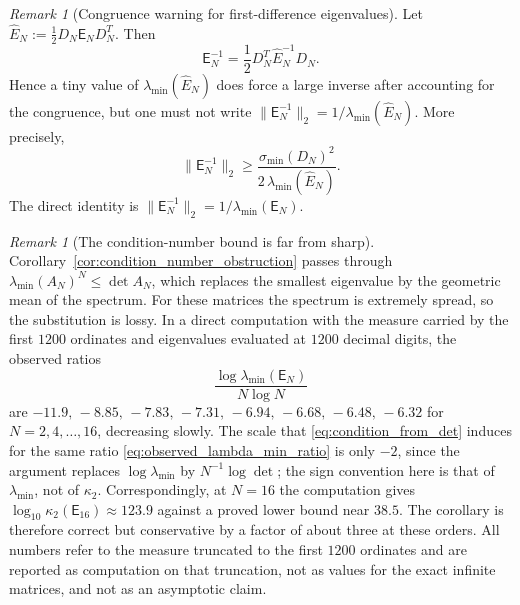 \documentclass[11pt]{amsart}
\numberwithin{equation}{section}
\theoremstyle{plain}
\theoremstyle{definition}
\theoremstyle{remark}
\newtheorem{remark}[theorem]{Remark}
\newcommand{\E}{\mathsf E}
\begin{document}
\begin{remark}[Congruence warning for first-difference eigenvalues]
\label{rem:first_difference_inverse_congruence}
Let
\(\widehat E_N:=\tfrac12D_N\E_ND_N^T\).  Then
\begin{equation}
\E_N^{-1}=\frac12D_N^T\widehat E_N^{-1}D_N.
\label{eq:E_inverse_from_Ehat}
\end{equation}
Hence a tiny value of \(\lambda_{\min}(\widehat E_N)\) does force a large inverse after
accounting for the congruence, but one must not write
\(\|\E_N^{-1}\|_2=1/\lambda_{\min}(\widehat E_N)\).  More precisely,
\begin{equation}
\|\E_N^{-1}\|_2
\ge
\frac{\sigma_{\min}(D_N)^2}{2\,\lambda_{\min}(\widehat E_N)}.
\label{eq:E_inverse_Ehat_lower}
\end{equation}
The direct identity is
\(\|\E_N^{-1}\|_2=1/\lambda_{\min}(\E_N)\).
\end{remark}

\begin{remark}[The condition-number bound is far from sharp]
\label{rem:condition_number_not_sharp}
Corollary~\ref{cor:condition_number_obstruction} passes through $\lambda_{\min}(A_N)^N\le\det A_N$, which replaces the smallest eigenvalue by the geometric mean of the spectrum. For these matrices the spectrum is extremely spread, so the substitution is lossy. In a direct computation with the measure carried by the first $1200$ ordinates and eigenvalues evaluated at $1200$ decimal digits, the observed ratios
\begin{equation}
\frac{\log\lambda_{\min}(\E_N)}{N\log N}
\label{eq:observed_lambda_min_ratio}
\end{equation}
are $-11.9,\,-8.85,\,-7.83,\,-7.31,\,-6.94,\,-6.68,\,-6.48,\,-6.32$ for $N=2,4,\dots,16$, decreasing slowly. The scale that \eqref{eq:condition_from_det} induces for the same ratio \eqref{eq:observed_lambda_min_ratio} is only $-2$, since the argument replaces $\log\lambda_{\min}$ by $N^{-1}\log\det$; the sign convention here is that of $\lambda_{\min}$, not of $\kappa_2$. Correspondingly, at $N=16$ the computation gives $\log_{10}\kappa_2(\E_{16})\approx123.9$ against a proved lower bound near $38.5$. The corollary is therefore correct but conservative by a factor of about three at these orders. All numbers refer to the measure truncated to the first $1200$ ordinates and are reported as computation on that truncation, not as values for the exact infinite matrices, and not as an asymptotic claim.
\end{remark}
\end{document}
